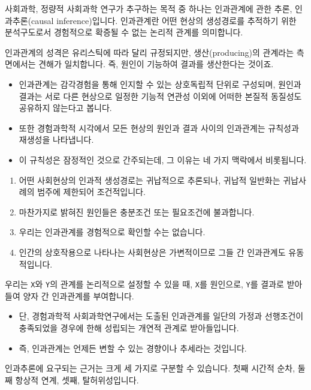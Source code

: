\documentclass[]{book}
\providecommand{\tightlist}{%
  \setlength{\itemsep}{0pt}\setlength{\parskip}{0pt}}
\begin{document}
사회과학, 정량적 사회과학 연구가 추구하는 목적 중 하나는 인과관계에 관한 추론, 인과추론(causal inference)입니다. 인과관계란 어떤 현상의 생성경로를 추적하기 위한 분석구도로서 경험적으로 확증될 수 없는 논리적 관계를 의미합니다.

인과관계의 성격은 유리스틱에 따라 달리 규정되지만, 생산(producing)의 관계라는 측면에서는 견해가 일치합니다. 즉, 원인이 기능하여 결과를 생산한다는 것이죠.

\begin{itemize}
\tightlist
\item
  인과관계는 감각경험을 통해 인지할 수 있는 상호독립적 단위로 구성되며, 원인과 결과는
  서로 다른 현상으로 일정한 기능적 연관성 이외에 어떠한 본질적 동질성도 공유하지 않는다고 봅니다.
\item
  또한 경험과학적 시각에서 모든 현상의 원인과 결과 사이의 인과관계는 규칙성과 재생성을
  나타냅니다.
\item
  이 규칙성은 잠정적인 것으로 간주되는데, 그 이유는 네 가지 맥락에서 비롯됩니다.
\end{itemize}

\begin{enumerate}
\def\labelenumi{\arabic{enumi}.}
\tightlist
\item
  어떤 사회현상의 인과적 생성경로는 귀납적으로 추론되나, 귀납적 일반화는 귀납사례의
  범주에 제한되어 조건적입니다.
\item
  마찬가지로 밝혀진 원인들은 충분조건 또는 필요조건에 불과합니다.
\item
  우리는 인과관계를 경험적으로 확인할 수는 없습니다.
\item
  인간의 상호작용으로 나타나는 사회현상은 가변적이므로 그들 간 인과관계도 유동적입니다.
\end{enumerate}

우리는 \texttt{X}와 \texttt{Y}의 관계를 논리적으로 설정할 수 있을 때, \texttt{X}를 원인으로, \texttt{Y}를 결과로 받아들여 양자 간 인과관계를 부여합니다.

\begin{itemize}
\tightlist
\item
  단, 경험과학적 사회과학연구에서는 도출된 인과관계를 일단의 가정과 선행조건이 충족되었을 경우에 한해 성립되는 개연적 관계로 받아들입니다.
\item
  즉, 인과관계는 언제든 변할 수 있는 경향이나 추세라는 것입니다.
\end{itemize}

인과추론에 요구되는 근거는 크게 세 가지로 구분할 수 있습니다. 첫째 시간적 순차, 둘째 항상적 연계, 셋째, 탈허위성입니다.
\end{document}
